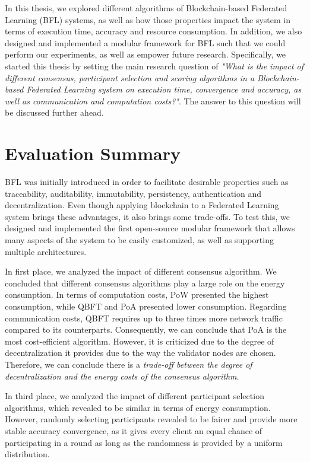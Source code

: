 In this thesis, we explored different algorithms of Blockchain-based Federated Learning (BFL) systems, as well as how those properties impact the system in terms of execution time, accuracy and resource consumption. In addition, we also designed and implemented a modular framework for BFL such that we could perform our experiments, as well as empower future research. Specifically, we started this thesis by setting the main research question of \textit{"What is the impact of different consensus, participant selection and scoring algorithms in a Blockchain-based Federated Learning system on execution time, convergence and accuracy, as well as communication and computation costs?"}. The answer to this question will be discussed further ahead.

\section{Evaluation Summary}\label{conclusions:evaluation}

BFL was initially introduced in order to facilitate desirable properties such as traceability, auditability, immutability, persistency, authentication and decentralization. Even though applying blockchain to a Federated Learning system brings these advantages, it also brings some trade-offs. To test this, we designed and implemented the first open-source modular framework that allows many aspects of the system to be easily customized, as well as supporting multiple architectures.

In first place, we analyzed the impact of different consensus algorithm. We concluded that different consensus algorithms play a large role on the energy consumption. In terms of computation costs, PoW presented the highest consumption, while QBFT and PoA presented lower consumption. Regarding communication costs, QBFT requires up to three times more network traffic compared to its counterparts. Consequently, we can conclude that PoA is the most cost-efficient algorithm. However, it is criticized due to the degree of decentralization it provides due to the way the validator nodes are chosen. Therefore, we can conclude there is a \textit{trade-off between the degree of decentralization and the energy costs of the consensus algorithm}.

In third place, we analyzed the impact of different participant selection algorithms, which revealed to be similar in terms of energy consumption. However, randomly selecting participants revealed to be fairer and provide more stable accuracy convergence, as it gives every client an equal chance of participating in a round as long as the randomness is provided by a uniform distribution.

